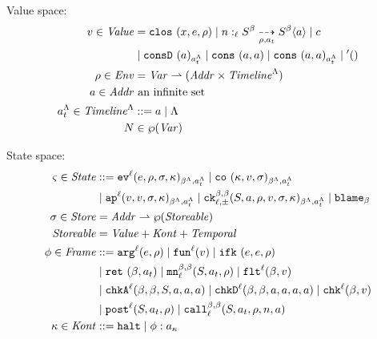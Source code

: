 \documentclass[preprint,onecolumn,9pt]{sigplanconf} %
\begin{document}
Value space:
\begin{align*}
  \mval \in \Value &=
    \clos{\mvar, \mexp, \menv}
   \alt \blclos{\mname}{\mmlab}{\mmlab}{\mlab}{\mscon}{\mscon}{\menv}{\mtimeline}{\maddr}
   \alt \mconstant \\
&  \alt \vconsf{\maddr}{\mstimeline}
   \alt \vcons{\maddr}{\maddr}
   \alt \vconst{\maddr}{\maddr}{\mstimeline}
   \alt \sunit \\
  \menv \in \Env &= \Var \parto (\Addr \times \Timeline^{\toplevel}) \\
  \maddr \in \Addr &\text{ an infinite set} \\
  \mstimeline \in \Timeline^{\toplevel} &::= \maddr \alt \toplevel \\
  \mnames &\in \wp(\Var) \\
\end{align*}

State space:
\begin{align*}
  \mstate \in \State &::=
      \ev[^\mlab]{\mexp, \menv, \msto, \mkont}{\msmlab}{\mstimeline}
 \alt \co{\mkont, \mval, \msto}{\msmlab}{\mstimeline} \\
&\alt \ap[^\mlab]{\mval, \mval, \msto, \mkont}{\msmlab}{\mstimeline}
 \alt \ck{\mmlab}{\mmlab}{\mlab}{\pm}{\mscon, \maddr, \menv, \mval, \msto, \mkont}{\msmlab}{\mstimeline}
 \alt \sblame{\mmlab} \\
\msto \in \Store &= \Addr \parto \wp(\Storeable) \\
\Storeable &= \Value + \Kont + \TContract \\
\mframe \in \Frame &::=
      \kar[^\mlab]{\mexp,\menv}
 \alt \kfn[^\mlab]{\mval}
 \alt \kif{\mexp, \mexp, \menv} \\
&\alt \krt{\mmlab, \mtimeline}
 \alt \kmon{\mmlab}{\mmlab}{\mlab}{\mscon, \mtimeline, \menv}
 \alt \kflat[^\mlab]{\mmlab, \mval} \\
&\alt \kchkA[^\mlab]{\mmlab, \mmlab, \mscon, \maddr, \maddr, \maddr}
 \alt \kchkD[^\mlab]{\mmlab, \mmlab, \maddr, \maddr, \maddr, \maddr}
 \alt \kcheck[^\mlab]{\mmlab, \mval} \\
&\alt \kpost[^\mlab]{\mscon, \mtimeline, \menv}
 \alt \kmcall{\mmlab}{\mmlab}{\mlab}{\mscon, \mtimeline, \menv, \mname, \maddr} \\
\mkont \in \Kont &::= \kmt \alt \spush{\mframe}{\mkaddr}
\end{align*}
\end{document}
